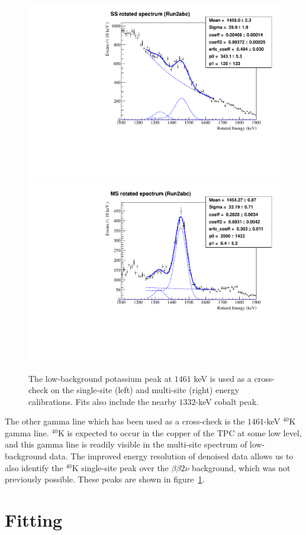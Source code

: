 \begin{figure}
\begin{center}
\includegraphics[keepaspectratio=true,width=.49\textwidth]{EXO_Workspace_Run2abc_K40_ss_1250keVto1650keV.pdf}
\includegraphics[keepaspectratio=true,width=.49\textwidth]{EXO_Workspace_Run2abc_K40_ms_1250keVto1650keV.pdf}
\end{center}
\renewcommand{\baselinestretch}{1}
\small\normalsize
\begin{quote}
\caption{The low-background potassium peak at $1461$ keV is used as a cross-check on the single-site (left) and multi-site (right) energy calibrations.  Fits also include the nearby $1332$-keV cobalt peak.~\cite{EnergyDocumentRun2ab}}
\label{fig:PotassiumPeakCheck}
\end{quote}
\end{figure}
\renewcommand{\baselinestretch}{2}
\small\normalsize

The other gamma line which has been used as a cross-check is the $1461$-keV $^{40}$K gamma line.  $^{40}$K is expected to occur in the copper of the TPC at some low level, and this gamma line is readily visible in the multi-site spectrum of low-background data.  The improved energy resolution of denoised data allows us to also identify the $^{40}$K single-site peak over the $\beta\beta 2\nu$ background, which was not previously possible.  These peaks are shown in figure~\ref{fig:PotassiumPeakCheck}.

\section{Fitting}\label{sec:ResultFitting}

